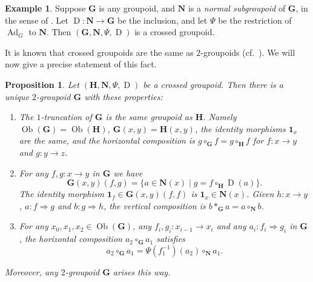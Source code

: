 \documentclass[a4paper,10pt]{amsart}
\newtheorem{prop}[equation]{Proposition}
\theoremstyle{definition}
\newtheorem{exa}[equation]{Example}
\numberwithin{equation}{section}
\newcommand{\opn}{\operatorname}
\newcommand{\rmitem}[1]{\item[\text{\textup{(#1)}}]}
\newcommand{\bsym}[1]{\boldsymbol{#1}}
\newcommand{\twoto}{\Rightarrow}
\begin{document}
\begin{exa}
Suppose $\bsym{G}$ is any groupoid, and $\bsym{N}$ is a {\em normal subgroupoid}
of $\bsym{G}$, in the sense of \cite{Bw, Ye4}. Let 
$\opn{D} : \bsym{N}\to \bsym{G}$ be the inclusion, and let 
$\Psi$ be the restriction of $\opn{Ad}_{G}$ to $\bsym{N}$. Then 
$(\bsym{G}, \bsym{N}, \Psi, \opn{D})$ is a crossed groupoid.
\end{exa}

It is known that crossed groupoids are the same as $2$-groupoids
(cf.\ \cite{Bw}). We will now give a precise statement of this fact. 

\begin{prop} \label{prop:102}
Let $(\bsym{H}, \bsym{N}, \Psi, \opn{D})$ 
be a crossed groupoid. Then there is a unique $2$-groupoid 
$\bsym{G}$ with these properties:
\begin{enumerate}
\rmitem{i} The $1$-truncation of $\bsym{G}$ is the same groupoid as
$\bsym{H}$. Namely $\opn{Ob}(\bsym{G}) = \opn{Ob}(\bsym{H})$,
$\bsym{G}(x, y) = \bsym{H}(x, y)$, the identity morphisms $\bsym{1}_x$ are the
same, and the horizontal composition is 
$g \circ_{\bsym{G}} f = g \circ_{\bsym{H}} f$
for $f : x \to y$ and $g : y \to z$.

\rmitem{ii} For any $f, g : x \to y$ in $\bsym{G}$ we have
\[ \bsym{G}(x, y)(f, g) = 
\{ a \in \bsym{N}(x) \mid g = f \circ_{\bsym{H}} \opn{D}(a) \} . \]
The identity morphism $\bsym{1}_f \in \bsym{G}(x, y)(f, f)$ is 
$\bsym{1}_x \in \bsym{N}(x)$.
Given $h : x \to y$, $a : f \twoto g$ and $b : g \twoto h$,
the vertical composition is 
$b \ast_{\bsym{G}} a = a \circ_{\bsym{N}} b$.

\rmitem{iii} For any $x_0, x_1, x_2 \in \opn{Ob}(\bsym{G})$, any
$f_i, g_i : x_{i-1} \to x_i$ and any
$a_i : f_i \twoto g_i$ in $\bsym{G}$, 
the horizontal composition $a_2 \circ_{\bsym{G}} a_1$ satisfies
\[ a_2 \circ_{\bsym{G}} a_1 =  
\Psi(f_1^{-1})(a_2) \circ_{\bsym{N}} a_1 . \]
\end{enumerate}

Moreover, any $2$-groupoid $\bsym{G}$ arises this way. 
\end{prop}
\end{document}
